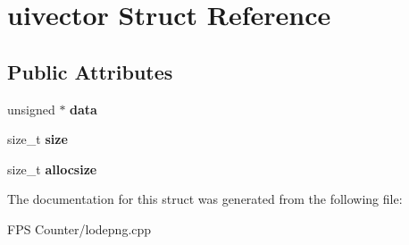 \hypertarget{structuivector}{}\section{uivector Struct Reference}
\label{structuivector}
\subsection*{Public Attributes}
\begin{DoxyCompactItemize}
\item 
\mbox{\label{structuivector_a427d761df4bb4f0f19b4a973fc224c78}} 
unsigned $\ast$ {\bfseries data}
\item 
\mbox{\label{structuivector_aa999025945f0c93d0461192475ae2720}} 
size\+\_\+t {\bfseries size}
\item 
\mbox{\label{structuivector_aac0395a9ad397ae7a28219561ab49ffa}} 
size\+\_\+t {\bfseries allocsize}
\end{DoxyCompactItemize}


The documentation for this struct was generated from the following file\+:\begin{DoxyCompactItemize}
\item 
F\+P\+S Counter/lodepng.\+cpp\end{DoxyCompactItemize}
